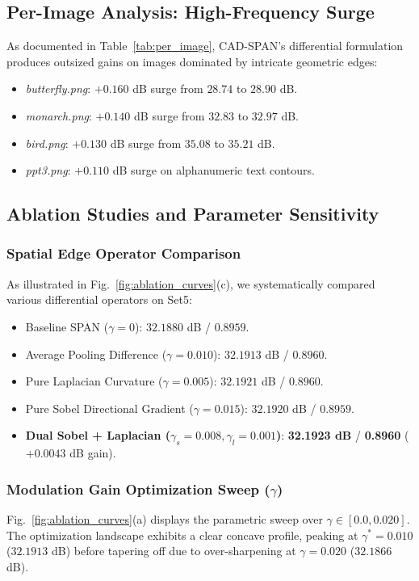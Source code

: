 \documentclass[conference]{IEEEtran}
\begin{document}
\enlargethispage{4.0\baselineskip}
\subsection{Per-Image Analysis: High-Frequency Surge}
As documented in Table~\ref{tab:per_image}, CAD-SPAN's differential formulation produces outsized gains on images dominated by intricate geometric edges:
\begin{itemize}
    \item \textit{butterfly.png}: $+0.160$ dB surge from $28.74$ to $28.90$ dB.
    \item \textit{monarch.png}: $+0.140$ dB surge from $32.83$ to $32.97$ dB.
    \item \textit{bird.png}: $+0.130$ dB surge from $35.08$ to $35.21$ dB.
    \item \textit{ppt3.png}: $+0.110$ dB surge on alphanumeric text contours.
\end{itemize}

\subsection{Ablation Studies and Parameter Sensitivity}

\subsubsection{Spatial Edge Operator Comparison}
As illustrated in Fig.~\ref{fig:ablation_curves}(c), we systematically compared various differential operators on Set5:
\begin{itemize}
    \item Baseline SPAN ($\gamma=0$): $32.1880$ dB / $0.8959$.
    \item Average Pooling Difference ($\gamma=0.010$): $32.1913$ dB / $0.8960$.
    \item Pure Laplacian Curvature ($\gamma=0.005$): $32.1921$ dB / $0.8960$.
    \item Pure Sobel Directional Gradient ($\gamma=0.015$): $32.1920$ dB / $0.8959$.
    \item \textbf{Dual Sobel + Laplacian ($\gamma_s=0.008, \gamma_l=0.001$)}: \textbf{32.1923 dB} / \textbf{0.8960} ($+0.0043$ dB gain).
\end{itemize}

\subsubsection{Modulation Gain Optimization Sweep ($\gamma$)}
Fig.~\ref{fig:ablation_curves}(a) displays the parametric sweep over $\gamma \in [0.0, 0.020]$. The optimization landscape exhibits a clear concave profile, peaking at $\gamma^* = 0.010$ ($32.1913$ dB) before tapering off due to over-sharpening at $\gamma = 0.020$ ($32.1866$ dB).
\end{document}

